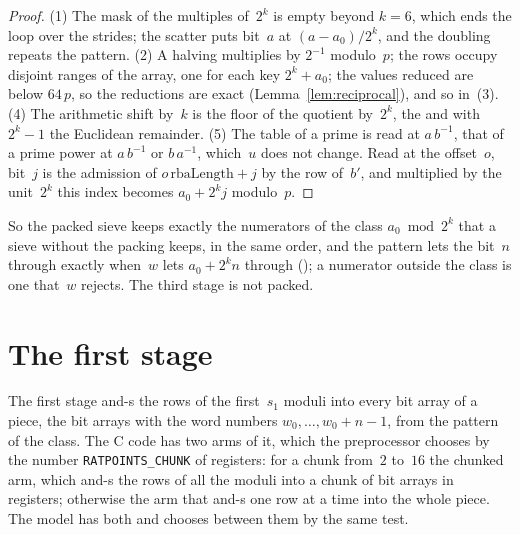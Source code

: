 \begin{proof}
  \leanok
  (1) The mask of the multiples of~$2^k$ is empty beyond $k = 6$, which ends the loop over the
  strides; the scatter puts bit~$a$ at $(a - a_0)/2^k$, and the doubling repeats the pattern.
  (2) A halving multiplies by $2^{-1}$ modulo~$p$; the rows occupy disjoint ranges of the array,
  one for each key $2^k + a_0$; the values reduced are below $64\, p$, so the reductions are exact
  (Lemma~\ref{lem:reciprocal}), and so in~(3). (4) The arithmetic shift by~$k$ is the floor of the
  quotient by~$2^k$, the and with $2^k - 1$ the Euclidean remainder. (5) The table of a prime is
  read at $a\, b^{-1}$, that of a prime power at $a\, b^{-1}$ or $b\, a^{-1}$, which~$u$ does not
  change. Read at the offset~$o$, bit~$j$ is the admission of $o\,\mathrm{rbaLength} + j$ by the
  row of~$b'$, and multiplied by the unit~$2^k$ this index becomes $a_0 + 2^k j$ modulo~$p$.
\end{proof}

So the packed sieve keeps exactly the numerators of the class $a_0 \bmod 2^k$ that a sieve without
the packing keeps, in the same order, and the pattern lets the bit~$n$ through exactly when~$w$ lets
$a_0 + 2^k n$ through (); a numerator outside
the class is one that~$w$ rejects. The third stage is not packed.

\section{The first stage}\label{sec:firstStage}

The first stage and-s the rows of the first~$s_1$ moduli into every bit array of a piece, the bit
arrays with the word numbers $w_0, \dots, w_0 + n - 1$, from the pattern of the class. The C code
has two arms of it, which the preprocessor chooses by the number \verb|RATPOINTS_CHUNK| of
registers: for a chunk from~$2$ to~$16$ the chunked arm, which and-s the rows of all the moduli into
a chunk of bit arrays in registers; otherwise the arm that and-s one row at a time into the whole
piece. The model has both and chooses between them by the same test.

